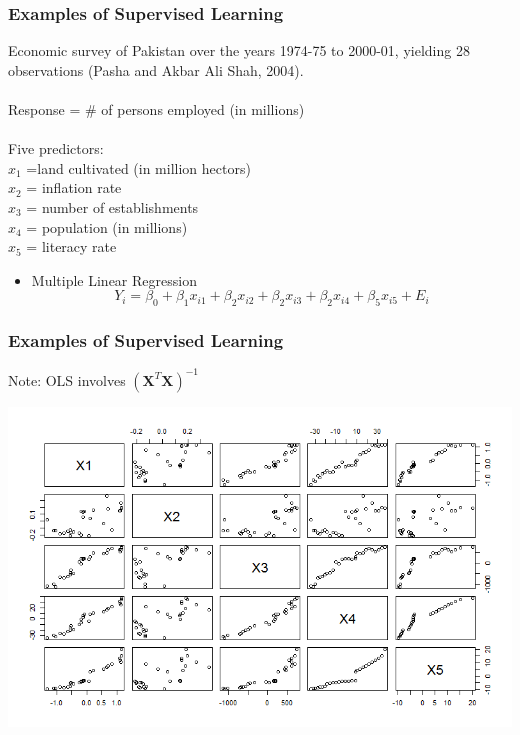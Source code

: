 \documentclass[hide notes,red,handout]{beamer}
\begin{document}
\begin{frame}[t]
\frametitle{Examples of Supervised Learning}
Economic survey of Pakistan over the years 1974-75 to 2000-01, yielding 28 observations (Pasha
and Akbar Ali Shah, 2004).\\~\\
Response = \# of persons employed (in millions)\\~\\\pause
Five predictors: \\
$x_1$ =land cultivated (in million hectors)\\
$x_2$ = inflation rate\\
$x_3$ = number of establishments\\
$x_4$ = population (in millions)\\
$x_5$ = literacy rate\\
\begin{itemize}\pause
\item Multiple Linear Regression
$$Y_i = \beta_0+\beta_1x_{i1}+\beta_2x_{i2}+\beta_2x_{i3}+\beta_2x_{i4}+\beta_5x_{i5}+E_i$$
\end{itemize}
\end{frame}

\begin{frame}[t]
\frametitle{Examples of Supervised Learning}
Note: OLS involves $(\boldsymbol{X}^{T}\boldsymbol{X})^{-1}$\\
\begin{center}
\includegraphics[scale=0.5]{scatters}
\end{center}
\end{frame}
\end{document}

